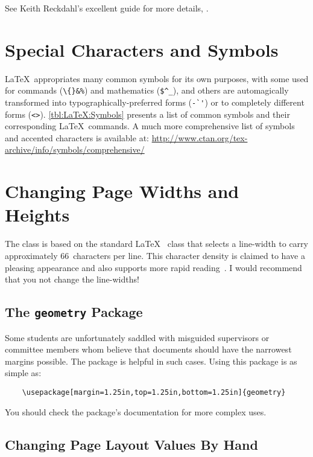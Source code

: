 See Keith Reckdahl’s excellent guide for more details,
.

\section{Special Characters and Symbols}
\label{sec:SpecialSymbols}

\LaTeX\ appropriates many common symbols for its own purposes,
with some used for commands (\ie \verb+\{}&%+) and
mathematics (\ie \verb+$^_+), and others are automagically transformed
into typographically-preferred forms (\ie \verb+-`'+) or to
completely different forms (\ie \verb+<>+).
\autoref{tbl:LaTeX:Symbols} presents a list of common symbols and
their corresponding \LaTeX\ commands.  A much more comprehensive list 
of symbols and accented characters is available at:
\url{http://www.ctan.org/tex-archive/info/symbols/comprehensive/}


\section{Changing Page Widths and Heights}

The  class is based on the standard \LaTeX\ 
class that selects a line-width to carry approximately 66~characters
per line.  This character density is claimed to have a pleasing
appearance and also supports more rapid
reading~\cite{bringhurst-2002-teots}.  I would recommend that you
not change the line-widths!

\subsection{The \texttt{geometry} Package}

Some students are unfortunately saddled with misguided supervisors
or committee members whom believe that documents should have the
narrowest margins possible.  The  package is
helpful in such cases.  Using this package is as simple as:
\begin{lstlisting}
    \usepackage[margin=1.25in,top=1.25in,bottom=1.25in]{geometry}
\end{lstlisting}
You should check the package's documentation for more complex uses.

\subsection{Changing Page Layout Values By Hand}

